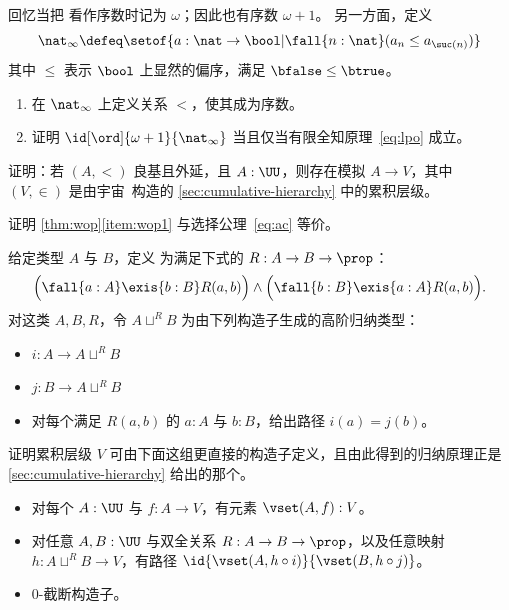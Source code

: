 \begin{ex}\label{ex:ninf-ord}
  回忆当把 \nat 看作序数时记为 $\omega$；因此也有序数 $\omega+1$。
  另一方面，定义
  \[ \nat_\infty \defeq \setof{a:\nat\to\bool | \fall{n:\nat} (a_n \le a_{\suc(n)}) } \]
  其中 $\le$ 表示 $\bool$ 上显然的偏序，满足 $\bfalse\le\btrue$。
  \begin{enumerate}
  \item 在 $\nat_\infty$ 上定义关系 $<$，使其成为序数。
  \item 证明 $\id[\ord]{\omega+1}{\nat_\infty}$ 当且仅当有限全知原理~\eqref{eq:lpo} 成立。%
  \end{enumerate}
\end{ex}

\begin{ex}\label{ex:well-founded-extensional-simulation}
  证明：若 $(A,<)$ 良基且外延，且 $A:\UU$，则存在模拟 $A\to V$，其中 $(V,\in)$ 是由宇宙~\UU 构造的 \cref{sec:cumulative-hierarchy} 中的累积层级。
\end{ex}

\begin{ex}\label{ex:choice-function}
  证明 \cref{thm:wop}\ref{item:wop1} 与选择公理~\eqref{eq:ac} 等价。
\end{ex}

\begin{ex}\label{ex:cumhierhit}
  给定类型 $A$ 与 $B$，定义
  为满足下式的 $R:A\to B\to \prop$：
  \[ \Big(\fall{a:A}\exis{b:B} R(a,b) \Big) \land \Big(\fall{b:B}\exis{a:A} R(a,b) \Big). \]
  对这类 $A,B,R$，令 $A\sqcup^R B$ 为由下列构造子生成的高阶归纳类型：
  \begin{itemize}
  \item $i:A\to A\sqcup^R B$
  \item $j:B\to A\sqcup^R B$
  \item 对每个满足 $R(a,b)$ 的 $a:A$ 与 $b:B$，给出路径 $i(a)=j(b)$。
  \end{itemize}
  证明累积层级 $V$ 可由下面这组更直接的构造子定义，且由此得到的归纳原理正是 \cref{sec:cumulative-hierarchy} 给出的那个。
  \begin{itemize}
  \item 对每个 $A : \UU$ 与 $f : A \to V$，有元素 $\vset(A, f) : V$。
  \item 对任意 $A,B:\UU$ 与双全关系
    $R:A\to B\to \prop$，以及任意映射 $h:A\sqcup^R B \to V$，有路径 $\id{\vset(A,h\circ i)}{\vset(B,h\circ j)}$。
  \item 0-截断构造子。
  \end{itemize}
\end{ex}

